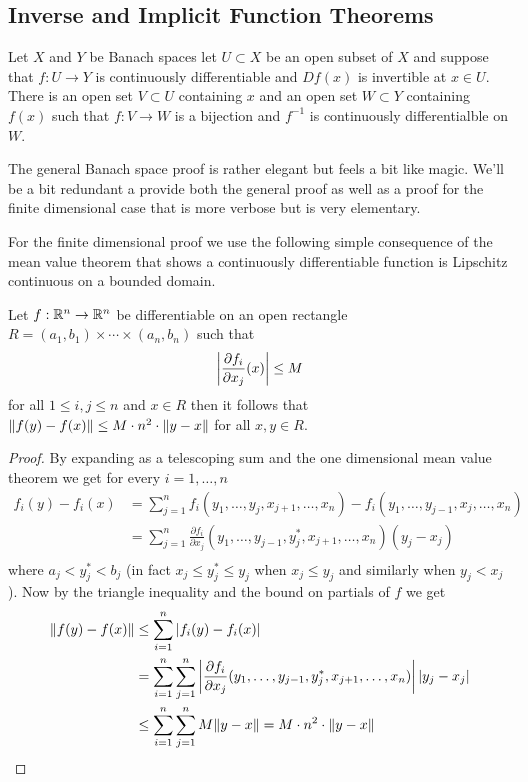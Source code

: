 \subsection{Inverse and Implicit Function Theorems}

\begin{thm}\label{InverseFunctionTheoremBanachSpaces}Let $X$ and $Y$ be Banach spaces let $U \subset X$ be an
  open subset of $X$ and suppose that $f : U \to Y$ is continuously
  differentiable and $Df(x)$ is invertible at $x \in U$.  There is an
  open set $V \subset U$ containing $x$ and an open set $W \subset Y$
  containing
  $f(x)$ such that $f : V \to W$ is a bijection and $f^{-1}$ is
  continuously differentialble on $W$.
\end{thm}

The general Banach space proof is rather elegant but feels a bit like
magic.  We'll be a bit redundant a  provide both the general proof as
well as a proof for the finite dimensional case that is more verbose
but is very elementary.

For the finite dimensional proof we use the following simple
consequence of the mean value theorem
that shows a continuously differentiable function is Lipschitz
continuous on a bounded domain.
\begin{lem}\label{IFT:BoundedDerivativeImpliesLipschitz}Let $f : \mathbb{R}^n \to \mathbb{R}^n$ be differentiable on an
  open rectangle $R = (a_1,b_1) \times \dotsm \times (a_n, b_n)$ such that 
\begin{align*}
\left \vert \frac{\partial f_i}{\partial x_j}(x) \right \vert \leq M
\end{align*}
for all $1 \leq i,j \leq n$ and $x \in R$ then it follows that
$\lVert f(y)-f(x) \rVert \leq M \cdot n^2 \cdot \lVert y-x \rVert$ for all $x,y \in R$.
\end{lem}
\begin{proof}
By expanding as a telescoping sum and the one
dimensional mean value theorem we
get for every $i=1, \dotsc, n$ 
\begin{align*}
f_i(y) - f_i(x) &= \sum_{j=1}^n f_i(y_1, \dotsc, y_j, x_{j+1},
                     \dotsc, x_n) - 
f_i(y_1, \dotsc, y_{j-1}, x_{j},
                     \dotsc, x_n)\\
&= \sum_{j=1}^n \frac{\partial f_i}{\partial x_j} (y_1, \dotsc, y_{j-1}, y^*_j, x_{j+1},
                     \dotsc, x_n) (y_j - x_j)\\
\end{align*}
where $a_j < y^*_j  < b_j$ (in fact $x_j \leq y^*_j \leq y_j$ when
$x_j \leq y_j$ and similarly when $y_j < x_j$).  Now by the triangle
inequality and the bound on partials of $f$ we get
\begin{align*}
\lVert f(y) - f(x) \rVert &\leq \sum_{i=1}^n \left \vert f_i(y) - f_i(x) \right \vert \\
&= \sum_{i=1}^n \sum_{j=1}^n \left \vert \frac{\partial f_i}{\partial x_j} (y_1, \dotsc, y_{j-1}, y^*_j, x_{j+1},
                     \dotsc, x_n) \right \vert \left \vert  y_j - x_j  \right \vert \\
&\leq \sum_{i=1}^n \sum_{j=1}^n M \lVert y - x \rVert = M \cdot n^2 \cdot
  \lVert y -x \rVert
\end{align*}
\end{proof}

